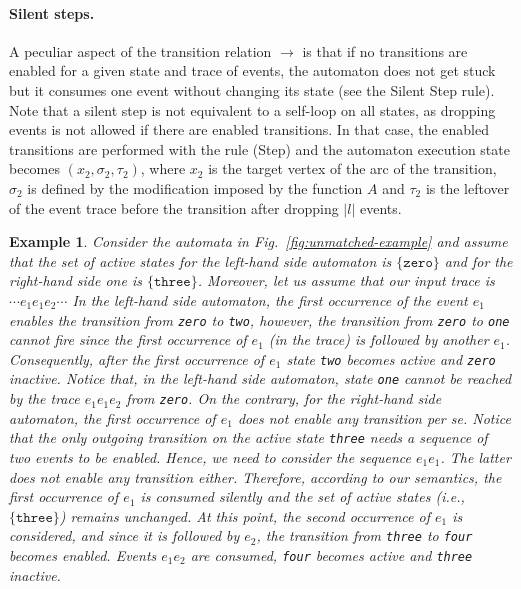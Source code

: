 \documentclass{sigplanconf}[10pt] %
\newtheorem{example}{Example}
\begin{document}
\paragraph{Silent steps.}
A peculiar aspect of the transition relation $\to$ is that if no transitions are enabled for a given
state and trace of events, the automaton does not get stuck but it
consumes one event without changing its state (see the  Silent Step rule). Note that
a silent step is not equivalent to a self-loop on all states, as
dropping events is not allowed if there are enabled
transitions. In that case,  the enabled transitions are performed 
with the rule (Step) and
the automaton execution state becomes $(x_2, \sigma_2,\tau_2)$, where $x_2$ is the target vertex of
the arc of the transition, $\sigma_2$ is defined by the modification imposed by the function $A$ and
$\tau_2$ is the leftover of the event trace before the transition after dropping
$|l|$ events.
\begin{example}
Consider the automata in Fig.~\ref{fig:unmatched-example} and assume that the set of active states for the left-hand side automaton is $\{ \texttt{zero} \}$ and for the right-hand side one is $\{ \texttt{three}\}$. Moreover, let us assume that our input trace is 
$\cdots e_1 e_1 e_2 \cdots$ In the left-hand side automaton, the first occurrence of the event $e_1$ enables the transition  from {\tt zero} to {\tt two}, however, the transition from {\tt zero} to {\tt one} cannot fire since the first occurrence of $e_1$ (in the trace) is followed by another $e_1$.
Consequently, after the first occurrence of $e_1$ state {\tt two} becomes active and {\tt zero} inactive. 
Notice that, in the left-hand side automaton, state {\tt one} cannot be reached by 
the trace $e_1 e_1 e_2 $ from {\tt zero}. 
On the contrary, for the right-hand side automaton, the first occurrence of $e_1$ does not enable any transition per se. 
Notice that the only outgoing transition on the active state {\tt three} needs a sequence of two events to be enabled. Hence, we need to consider the sequence $e_1e_1$. The latter does not enable any transition either. Therefore, according to our semantics,  the first occurrence of $e_1$ is consumed silently and the set of active states (i.e., $\{ \texttt{three} \}$) remains unchanged. At this point, the second occurrence of $e_1$ is considered, and since it is followed by $e_2$, the transition from {\tt three} to {\tt four} becomes enabled. Events $e_1e_2$ are consumed, {\tt four} becomes active and {\tt three} inactive.
\end{example}
\end{document}
